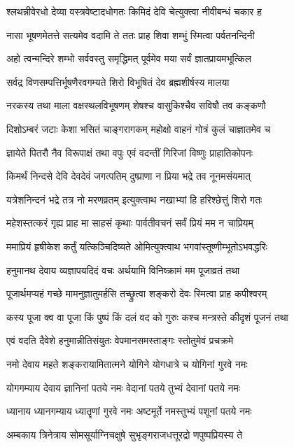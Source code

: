 \twolineshloka
{श्लथन्नीवेरधो देव्या वस्त्रवेष्टादधोगतः}
{किमिदं देवि चेत्युक्त्वा नीवीबन्धं चकार ह}%

\twolineshloka
{नासा भूषणमेतत्ते सत्यमेव वदामि ते}
{ततः प्राह शिवा शम्भुं स्मित्वा पर्वतनन्दिनी}%

\twolineshloka
{अहो त्वन्मन्दिरे शम्भो सर्ववस्तु समृद्धिमत्}
{पूर्वमेव मया सर्वं ज्ञातप्रायमभूत्किल}%

\twolineshloka
{सर्वद्र विणसम्पत्तिर्भूषणैरवगम्यते}
{शिरो विभूषितं देव ब्रह्मशीर्षस्य मालया}%

\twolineshloka
{नरकस्य तथा माला वक्षस्थलविभूषणम्}
{शेषश्च वासुकिश्चैव सविषौ तव कङ्कणौ}%

\twolineshloka
{दिशोऽम्बरं जटाः केशा भसितं चाङ्गरागकम्}
{महोक्षो वाहनं गोत्रं कुलं चाज्ञातमेव च}%

\twolineshloka
{ज्ञायेते पितरौ नैव विरूपाक्षं तथा वपुः}
{एवं वदन्तीं गिरिजां विष्णुः प्राहातिकोपनः}%

\twolineshloka
{किमर्थं निन्दसे देवि देवदेवं जगत्पतिम्}
{दुष्प्राणा न प्रिया भद्रे तव नूनमसंयमात्}%

\twolineshloka
{यत्रेशनिन्दनं भद्रे तत्र नो मरणव्रतम्}
{इत्युक्त्वाथ नखाभ्यां हि हरिश्छेत्तुं शिरो गतः}%

\twolineshloka
{महेशस्तत्करं गृह्य प्राह मा साहसं कृथाः}
{पार्वतीवचनं सर्वं प्रियं मम न चाप्रियम्}%

\twolineshloka
{ममाप्रियं हृषीकेश कर्तुं यत्किञ्चिदिष्यते}
{ओमित्युक्त्वाथ भगवांस्तूष्णीम्भूतोऽभवद्धरिः}%

\twolineshloka
{हनुमानथ देवाय व्यज्ञापयदिदं वचः}
{अर्थयामि विनिष्क्रामं मम पूजाव्रतं तथा}%

\twolineshloka
{पूजार्थमप्यहं गच्छे मामनुज्ञातुमर्हसि}
{तच्छ्रुत्वा शङ्करो देवः स्मित्वा प्राह कपीश्वरम्}%

\twolineshloka
{कस्य पूजा क्व वा पूजा किं पुष्पं किं दलं वद}
{को गुरुः कश्च मन्त्रस्ते कीदृशं पूजनं तथा}%

\twolineshloka
{एवं वदति दैवेशे हनुमान्नीतिसंयुतः}
{वेपमानसमस्ताङ्गः स्तोतुमेवं प्रचक्रमे}%

\twolineshloka
{नमो देवाय महते शङ्करायामितात्मने}
{योगिने योगधात्रे च योगिनां गुरवे नमः}%

\twolineshloka
{योगगम्याय देवाय ज्ञानिनां पतये नमः}
{वेदानां पतये तुभ्यं देवानां पतये नमः}%

\twolineshloka
{ध्यानाय ध्यानगम्याय ध्यातॄणां गुरवे नमः}
{अष्टमूर्ते नमस्तुभ्यं पशूनां पतये नमः}%

\twolineshloka
{अम्बकाय त्रिनेत्राय सोमसूर्याग्निचक्षुषे}
{सुभृङ्गराजधत्तूरद्रो णपुष्पप्रियस्य ते}%

